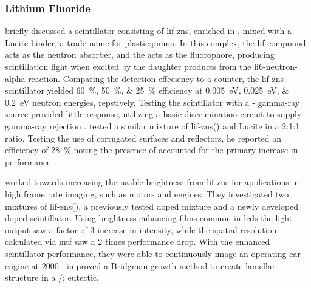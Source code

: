 \documentclass[../../../../main.tex]{subfiles}%
\begin{document}
%
    \subsubsection{Lithium Fluoride}%
    \label{sec:chapter-2:scintillator-detectors:ceramics:lithium-fluoride}%
    \citeauthor*{Stedman_1960} briefly discussed a scintillator consisting of \gls{lif-zns}, enriched in , mixed with a Lucite binder, a trade name for \gls{plastic:pmma}.
    In this complex, the \gls{lif} compound acts as the neutron absorber, and the  acts as the fluorophore, producing scintillation light when excited by the daughter products from the \gls{li6-neutron-alpha} reaction.
    Comparing the detection effeciency to a  counter, the \gls{lif-zns} scintillator yielded \SIlist[list-units={repeat}]{60; 50; 25}{\percent} efficiency at \SIlist[list-units={repeat}]{0.005; 0.025; 0.2}{\electronvolt} neutron energies, repstively.
    Testing the scintillator with a - \gls{gamma-ray} source provided little response, utilizing a basic discrimination circuit to supply \gls{gamma-ray} rejection \cite{Stedman_1960}.
    \citeauthor*{Helm_1962} tested a similar mixture of \gls{lif-zns}() and Lucite in a 2:1:1 ratio.
    Testing the use of corrugated surfaces and reflectors, he reported an efficiency of \SI{28}{\percent} noting the presence of  accounted for the primary increase in performance \cite{Helm_1962}.
    \par%
    \citeauthor*{Iikura_2011} worked towards increasing the usable brightness from \gls{lif-zns} for applications in high frame rate imaging, such as motors and engines.
    They investigated two mixtures of \gls{lif-zns}(), a previously tested  doped mixture and a newly developed  doped scintillator.
    Using brightness enhancing films common in \glspl{lcd} the light output saw a factor of \num{3} increase in intensity, while the spatial resolution calculated via \gls{mtf} saw a \num{2} times performance drop.
    With the enhanced scintillator performance, they were able to continuously image an operating car engine at \SI{2000}{\rpm} \cite{Iikura_2011}.
    \citeauthor*{Kawaguchi_2011} improved a Bridgman growth method to create lamellar structure in a /: eutectic.
\end{document}
